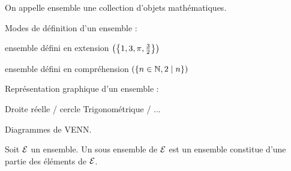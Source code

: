 \documentclass[12pt,twoside,a4paper]{article}
\author{MPSI 2}
\begin{document}
	\maketitle
	\begin{defi}
		On appelle ensemble une collection d'objets mathématiques.
		\begin{liste}
			\item Modes de définition d'un ensemble :
				\begin{liste}
					\item ensemble défini en extension			$\left(\left\{1,3,\pi,\frac{3}{2}\right\}\right)$
					\item ensemble défini en compr\'ehension		$\left(\left\{n\in\mathbb{N},2\mid n\right\}\right)$
				\end{liste}
			\item Repr\'esentation graphique d'un ensemble :
				\begin{liste}
					\item Droite r\'eelle / cercle Trigonom\'etrique / ...
					\item Diagrammes de VENN.
				\end{liste}
			\end{liste}
	\end{defi}
	\begin{defi}
		Soit $\mathcal{E}$ un ensemble. Un sous ensemble de $\mathcal{E}$ est un ensemble constitue d'une partie des \'el\'ements de $\mathcal{E}$.
	\end{defi}
\end{document}
